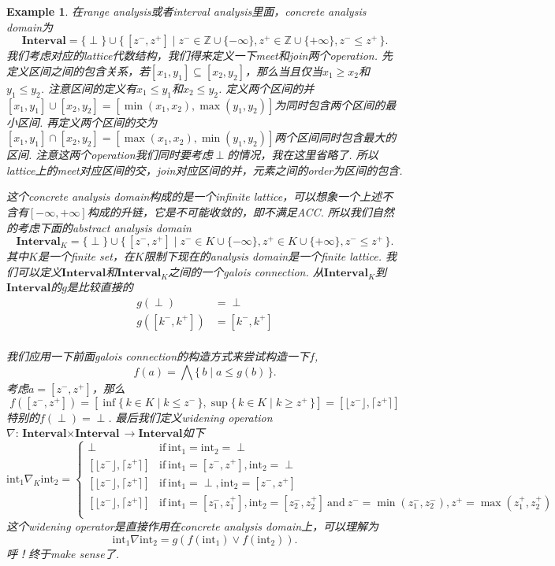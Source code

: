 \documentclass{article}
\newtheorem{example}[theorem]{Example}
\newcommand*{\xfunc}[4]{{#2}\colon{#3}{#1}{#4}}
\newcommand*{\func}[3]{\xfunc{\to}{#1}{#2}{#3}}
\newcommand\Set[2]{\{\,#1\mid#2\,\}} %
\begin{document}
\begin{example}
\rm 在range analysis或者interval analysis里面，concrete analysis domain为
$$
\textbf{Interval} = \{\perp\} \cup \Set{[z^-,z^+]}{z^- \in \mathbb{Z} \cup \{-\infty\}, z^+ \in \mathbb{Z} \cup \{+\infty\}, z^- \leq z^+ }.
$$
我们考虑对应的lattice代数结构，我们得来定义一下meet和join两个operation. 先定义区间之间的包含关系，若$[x_1,y_1] \subseteq [x_2,y_2]$，那么当且仅当$x_1 \geq x_2$和$y_1 \leq y_2$. 注意区间的定义有$x_1 \leq y_1$和$x_2 \leq y_2$. 定义两个区间的并$[x_1, y_1] \cup [x_2, y_2] = [\min(x_1,x_2),\max(y_1,y_2)]$为同时包含两个区间的最小区间. 再定义两个区间的交为$[x_1, y_1] \cap [x_2, y_2] = [\max(x_1,x_2),\min(y_1,y_2)]$两个区间同时包含最大的区间. 注意这两个operation我们同时要考虑$\perp$的情况，我在这里省略了. 所以lattice上的meet对应区间的交，join对应区间的并，元素之间的order为区间的包含.

这个concrete analysis domain构成的是一个infinite lattice，可以想象一个上述不含有$[-\infty, +\infty]$构成的升链，它是不可能收敛的，即不满足ACC. 所以我们自然的考虑下面的abstract analysis domain
$$
\textbf{Interval}_K = \{\perp\} \cup \Set{[z^-,z^+]}{z^- \in K \cup \{-\infty\}, z^+ \in K \cup \{+\infty\}, z^- \leq z^+ }.
$$
其中$K$是一个finite set，在$K$限制下现在的analysis domain是一个finite lattice. 我们可以定义$\textbf{Interval}$和$\textbf{Interval}_K$之间的一个galois connection. 从$\textbf{Interval}_K$到$\textbf{Interval}$的$g$是比较直接的
$$
\begin{aligned}
g(\perp) &= \perp \\
g([k^-,k^+]) &= [k^-, k^+] \\
\end{aligned}
$$

我们应用一下前面galois connection的构造方式来尝试构造一下$f$,
$$
f(a) = \bigwedge\Set{b}{a \leq g(b)}.
$$
考虑$a = [z^-, z^+]$，那么
$$
f([z^-,z^+]) =[\inf\Set{k \in K}{k \leq z^-}, \sup\Set{k \in K}{k \geq z^+}] = [\lfloor z^- \rfloor, \lceil z^+ \rceil]
$$
特别的$f(\perp) = \perp$. 最后我们定义widening operation $\func{\nabla}{\textbf{Interval} \times \textbf{Interval}}{\textbf{Interval}}$如下
$$
\text{int}_1 \nabla_K \text{int}_2 =\left\{ \begin{array}{ll} 
\perp & \text{if}~\text{int}_1 = \text{int}_2 = \perp\\
\left[\lfloor z^- \rfloor, \lceil z^+ \rceil \right] & \text{if}~\text{int}_1 = [z^-,z^+] ,\text{int}_2 = \perp \\
\left[\lfloor z^- \rfloor, \lceil z^+ \rceil \right] & \text{if}~\text{int}_1 = \perp ,\text{int}_2 = [z^-,z^+] \\
\left[\lfloor z^- \rfloor, \lceil z^+ \rceil \right] & \text{if}~\text{int}_1 = [z_1^-,z_1^+] ,\text{int}_2 = [z_2^-,z_2^+] ~ \text{and}~ z^- = \min(z_1^-,z_2^-), z^+ = \max(z_1^+,z_2^+)\\
\end{array} \right.
$$
这个widening operator是直接作用在concrete analysis domain上，可以理解为
$$
\text{int}_1 \nabla \text{int}_2 = g(f(\text{int}_1) \vee f(\text{int}_2)).
$$
呼！终于make sense了.


\end{example}
\end{document}
